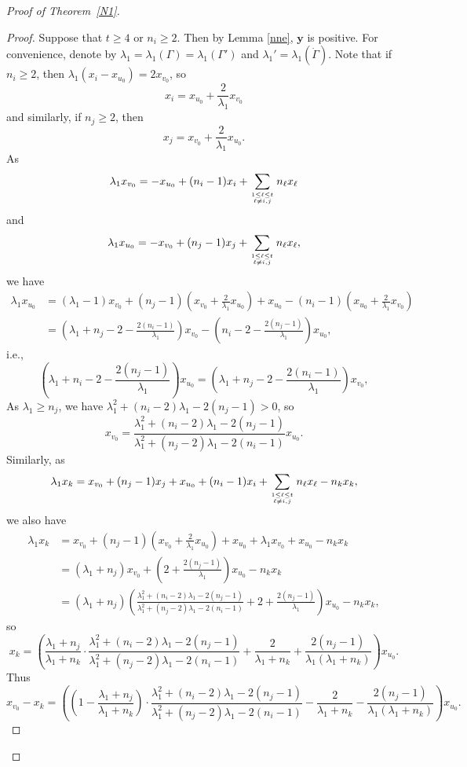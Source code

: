 \documentclass[12pt]{article}
\numberwithin{equation}{section}
\begin{document}
\begin{proof}[Proof of Theorem~\ref{N1}]
\begin{proof}
Suppose that $t\ge 4$ or $n_i\ge 2$. Then by Lemma \ref{nne}, $\mathbf{y}$ is positive. 
For convenience, denote by $\lambda_1=\lambda_1(\Gamma)=\lambda_1(\Gamma')$ and $\lambda_1'=\lambda_1(\dot{\Gamma})$.  
Note that if $n_i\ge 2$, then $\lambda_1(x_i-x_{u_0})=2x_{v_0}$, so  
\[
x_i=x_{u_0}+\frac{2}{\lambda_1}x_{v_0}
\]
and  similarly, if $n_j\ge 2$, then  %
\[
x_j=x_{v_0}+\frac{2}{\lambda_1}x_{u_0}. 
\]
As
\[
\lambda_1x_{v_0}=-x_{u_0}+(n_i-1)x_i+\sum_{1\le \ell\le t\atop\ell\ne i, j}n_\ell x_\ell
\]
and
\[
\lambda_1x_{u_0} = -x_{v_0}+(n_j-1)x_j+\sum_{1\le \ell\le t\atop\ell\ne i, j}n_\ell x_\ell,
\]
we have
\begin{align*}
\lambda_1x_{u_0}
& = (\lambda_1-1)x_{v_0}+(n_j-1)\left(x_{v_0}+\frac{2}{\lambda_1}x_{u_0}\right)+x_{u_0}-(n_i-1)\left(x_{u_0}+\frac{2}{\lambda_1}x_{v_0}\right)\\
& = \left(\lambda_1+n_j-2-\frac{2(n_i-1)}{\lambda_1}\right)x_{v_0}-\left(n_i-2-\frac{2(n_j-1)}{\lambda_1}\right)x_{u_0}, 
\end{align*}
i.e.,
\[
\left(\lambda_1+n_i-2-\frac{2(n_j-1)}{\lambda_1}\right)x_{u_0}=\left(\lambda_1+n_j-2-\frac{2(n_i-1)}{\lambda_1}\right)x_{v_0}, 
\]
As $\lambda_1\ge n_j$, we have $\lambda_1^2+(n_i-2)\lambda_1-2(n_j-1)>0$, so
\[
x_{v_0}=\frac{\lambda_1^2+(n_i-2)\lambda_1-2(n_j-1)}{\lambda_1^2+(n_j-2)\lambda_1-2(n_i-1)}x_{u_0}. 
\]
Similarly, as
\[
\lambda_1x_k=x_{v_0}+(n_j-1)x_j+x_{u_0}+(n_i-1)x_i+\sum_{1\le \ell\le t\atop\ell\ne i, j}n_\ell x_\ell-n_kx_k,
\]
we also have
\begin{align*}
\lambda_1x_k
& =x_{v_0}+(n_j-1)\left(x_{v_0}+\frac{2}{\lambda_1}x_{u_0}\right)+x_{u_0}+\lambda_1x_{v_0}+x_{u_0}-n_kx_k\\
& =(\lambda_1+n_j)x_{v_0}+\left(2+\frac{2(n_j-1)}{\lambda_1}\right)x_{u_0}-n_kx_k\\
& =(\lambda_1+n_j)\left(\frac{\lambda_1^2+(n_i-2)\lambda_1-2(n_j-1)}{\lambda_1^2+(n_j-2)\lambda_1-2(n_i-1)}+2+\frac{2(n_j-1)}{\lambda_1}\right)x_{u_0}-n_kx_k, 
\end{align*}
so
\[
x_k=\left(\frac{\lambda_1+n_j}{\lambda_1+n_k}\cdot\frac{\lambda_1^2+(n_i-2)\lambda_1-2(n_j-1)}{\lambda_1^2+(n_j-2)\lambda_1-2(n_i-1)}+\frac{2}{\lambda_1+n_k}+\frac{2(n_j-1)}{\lambda_1(\lambda_1+n_k)}\right)x_{u_0}. 
\]
Thus 
\[
x_{v_0}-x_k=\left(\left(1-\frac{\lambda_1+n_j}{\lambda_1+n_k}\right)\cdot\frac{\lambda_1^2+(n_i-2)\lambda_1-2(n_j-1)}{\lambda_1^2+(n_j-2)\lambda_1-2(n_i-1)}-\frac{2}{\lambda_1+n_k}-\frac{2(n_j-1)}{\lambda_1(\lambda_1+n_k)}\right)x_{u_0}. 
\]
\end{proof}
\end{proof}
\end{document}
